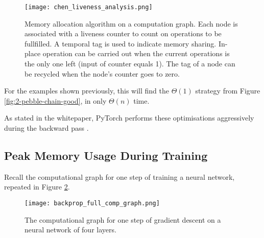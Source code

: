 \begin{figure}[h]
    \centering
    \texttt{[image: chen\_liveness\_analysis.png]}
    \caption{Memory allocation algorithm on a computation graph. Each node is associated with a liveness counter to count on operations to be fullfilled. A temporal tag is used to indicate memory sharing. In-place operation can be carried out when the current operations is the only one left (input of counter equals 1). The tag of a node can be recycled when the node’s counter goes to zero. \cite[Figure~2]{Chen2016}}
    \label{fig:2-chen-LA}
\end{figure}

For the examples shown previously, this will find the \(\Theta(1)\) strategy from Figure \ref{fig:2-pebble-chain-good}, in only \(\Theta(n)\) time.

As stated in the whitepaper, PyTorch performs these optimisations aggressively during the backward pass \cite[p.~3]{Paszke2017}.

\subsection{Peak Memory Usage During Training} \label{sec:2-4-2-peak-mem-training}
Recall the computational graph for one step of training a neural network, repeated in Figure \ref{fig:2-nn-comp-graph-2}.

\begin{figure}[htb]
    \centering
    \texttt{[image: backprop\_full\_comp\_graph.png]}
    \caption{The computational graph for one step of gradient descent on a neural network of four layers.}
    \label{fig:2-nn-comp-graph-2}
\end{figure}

